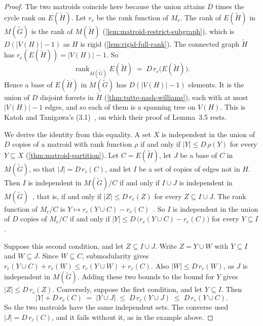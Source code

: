 \begin{proof}
  The two matroids coincide here because the union attains $D$ times the
  cycle rank on $E(\tilde H)$. Let $r_c$ be the rank function of $M_c$.
  The rank of $E(\tilde H)$ in $M(\tilde G)$ is the rank of $M(\tilde H)$
  (\cref{lem:matroid-restrict-subgraph}), which is $D(|V(H)| - 1)$ as $H$
  is rigid (\cref{lem:rigid-full-rank}). The connected graph $\tilde H$
  has $r_c(E(\tilde H)) = |V(H)| - 1$. So
  \[
    \operatorname{rank}_{M(\tilde G)} E(\tilde H) \;=\;
    D\, r_c\bigl(E(\tilde H)\bigr).
  \]
  Hence a base of $E(\tilde H)$ in $M(\tilde G)$ has $D(|V(H)| - 1)$
  elements. It is the union of $D$ disjoint forests in $\tilde H$
  (\cref{thm:tutte-nash-williams}), each with at most $|V(H)| - 1$
  edges, and so each of them is a spanning tree on $V(H)$. This is Katoh and Tanigawa's (3.1)~\cite[p.~658]{katohTanigawa2011}, on
  which their proof of Lemma~3.5 rests.

  We derive the identity from this equality. A set $X$ is independent in
  the union of $D$ copies of a matroid with rank function $\rho$ if and
  only if $|Y| \le D\,\rho(Y)$ for every $Y \subseteq X$
  (\cref{thm:matroid-partition}). Let
  $C = E(\tilde H)$, let $J$ be a base of $C$ in $M(\tilde G)$, so that
  $|J| = D\, r_c(C)$, and let $I$ be a set of copies of edges not in
  $H$. Then $I$ is independent in $M(\tilde G)/C$ if and only if
  $I \cup J$ is independent in
  $M(\tilde G)$~\cite[Proposition~3.1.7]{oxley2011}, that is, if and only
  if $|Z| \le D\, r_c(Z)$ for every $Z \subseteq I \cup J$. The rank
  function of $M_c/C$ is $Y \mapsto r_c(Y \cup C) - r_c(C)$~\cite[Proposition~3.1.6]{oxley2011}.
  So $I$ is independent in the union of $D$ copies of $M_c/C$ if and only
  if $|Y| \le D\,\bigl(r_c(Y \cup C) - r_c(C)\bigr)$ for every
  $Y \subseteq I$.

  Suppose this second condition, and let $Z \subseteq I \cup J$. Write
  $Z = Y \cup W$ with $Y \subseteq I$ and $W \subseteq J$. Since
  $W \subseteq C$, submodularity gives
  $r_c(Y \cup C) + r_c(W) \le r_c(Y \cup W) + r_c(C)$. Also
  $|W| \le D\, r_c(W)$, as $J$ is independent in $M(\tilde G)$. Adding
  these two bounds to the bound for $Y$ gives $|Z| \le D\, r_c(Z)$.
  Conversely, suppose the first condition, and let $Y \subseteq I$. Then
  \[
    |Y| + D\, r_c(C) \;=\; |Y \cup J| \;\le\; D\, r_c(Y \cup J)
    \;\le\; D\, r_c(Y \cup C).
  \]
  So the two matroids have the same independent sets. The converse used
  $|J| = D\, r_c(C)$, and it fails without it, as in the example above.
\end{proof}

